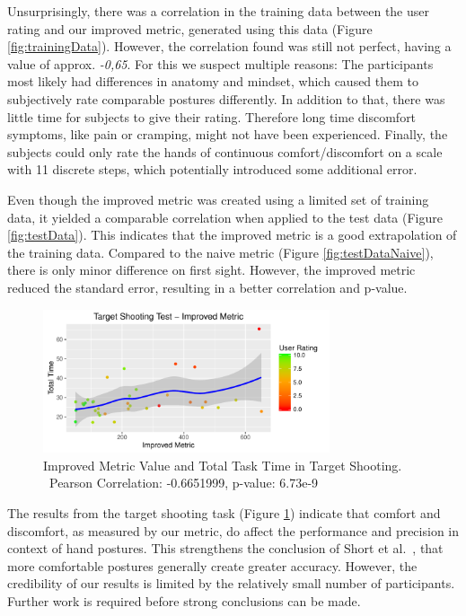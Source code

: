 \documentclass[headsepline,footsepline,footinclude=false,oneside,fontsize=11pt,paper=a4,listof=totoc,bibliography=totoc]{scrbook} %
\begin{document}
Unsurprisingly, there was a correlation in the training data between the user rating and our improved metric, generated using this data (Figure \ref{fig:trainingData}). However, the correlation found was still not perfect, having a value of approx. \textsl{-0,65}. For this we suspect multiple reasons: 
The participants most likely had differences in anatomy and mindset, which caused them to subjectively rate comparable postures differently. In addition to that, there was little time for subjects to give their rating. Therefore long time discomfort symptoms, like pain or cramping, might not have been experienced. Finally, the subjects could only rate the hands of continuous comfort/discomfort on a scale with 11 discrete steps, which potentially introduced some additional error.

Even though the improved metric was created using a limited set of training data, it yielded a comparable correlation when applied to the test data (Figure \ref{fig:testData}). This indicates that the improved metric is a good extrapolation of the training data. Compared to the naive metric (Figure \ref{fig:testDataNaive}), there is only minor difference on first sight. However, the improved metric reduced the standard error, resulting in a better correlation and p-value.

\begin{figure}[h]
\centering
\includegraphics[width=8.45cm]{TargetShooting}
\vspace{-20pt}
\caption{Improved Metric Value and Total Task Time in Target Shooting.\\\
Pearson Correlation: -0.6651999, p-value: 6.73e-9}
\label{fig:targetShooting}
\vspace{-5pt}
\end{figure}

The results from the target shooting task (Figure \ref{fig:targetShooting}) indicate that comfort and discomfort, as measured by our metric, do affect the performance and precision in context of hand postures. This strengthens the conclusion of Short et al.~\cite{short1999precision}, that more comfortable postures generally create greater accuracy. However, the credibility of our results is limited by the relatively small number of participants. Further work is required before strong conclusions can be made.
\end{document}
